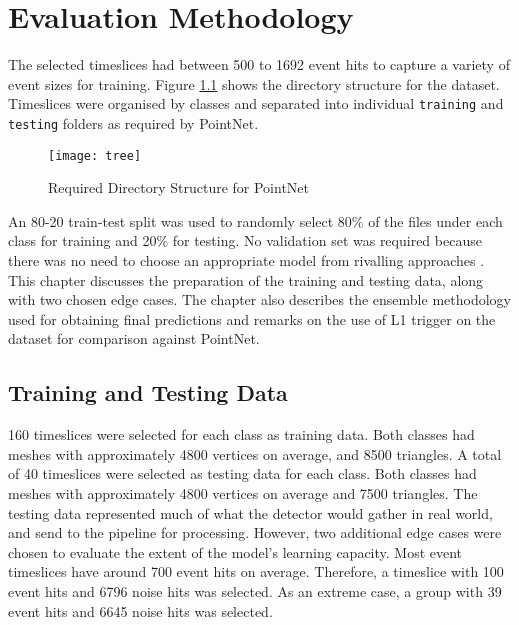 \chapter{Evaluation Methodology}
\label{sec:evaluation}
\ifpdf
    \graphicspath{{6_evaluation/figures/PNG/}{6_evaluation/figures/PDF/}{6_evaluation/figures/}}
\else
    \graphicspath{{6_evaluation/figures/EPS/}{6_evaluation/figures/}}
\fi

The selected timeslices had between 500 to 1692 event hits to capture a variety of event sizes for training. Figure \ref{fig:7_tree} shows the directory structure for the dataset. Timeslices were organised by classes and separated into individual \texttt{training} and \texttt{testing} folders as required by PointNet.

\begin{figure}[ht!]
    \centering
    \texttt{[image: tree]}
    \caption{Required Directory Structure for PointNet}
    \label{fig:7_tree}
\end{figure}

An 80-20 train-test split was used to randomly select 80\% of the files under each class for training and 20\% for testing. No validation set was required because there was no need to choose an appropriate model from rivalling approaches \cite{dixon2017deep, james2013introduction}. This chapter discusses the preparation of the training and testing data, along with two chosen edge cases. The chapter also describes the ensemble methodology used for obtaining final predictions and remarks on the use of L1 trigger on the dataset for comparison against PointNet.

\section{Training and Testing Data}
\label{sec:eval_train_test_data}
160 timeslices were selected for each class as training data. Both classes had meshes with approximately 4800 vertices on average, and 8500 triangles. A total of 40 timeslices were selected as testing data for each class. Both classes had meshes with approximately 4800 vertices on average and 7500 triangles. The testing data represented much of what the detector would gather in real world, and send to the pipeline for processing. However, two additional edge cases were chosen to evaluate the extent of the model's learning capacity. Most event timeslices have around 700 event hits on average. Therefore, a timeslice with 100 event hits and 6796 noise hits was selected. As an extreme case, a group with 39 event hits and 6645 noise hits was selected.

